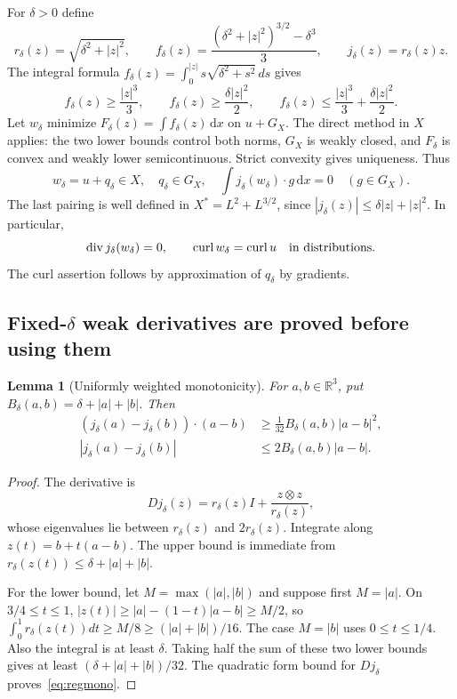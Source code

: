 \documentclass[11pt,a4paper]{article}
\newtheorem{lemma}[theorem]{Lemma}
\theoremstyle{definition}
\newcommand{\R}{\mathbb R}
\newcommand{\dd}{\,\mathrm dx}
\DeclareMathOperator{\diver}{div}
\DeclareMathOperator{\curl}{curl}
\begin{document}
For $\delta>0$ define
\begin{equation}\label{eq:regularizer}
 r_\delta(z)=\sqrt{\delta^2+|z|^2},\qquad
 f_\delta(z)=\frac{(\delta^2+|z|^2)^{3/2}-\delta^3}{3},\qquad
 j_\delta(z)=r_\delta(z)z.
\end{equation}
The integral formula $f_\delta(z)=\int_0^{|z|}s\sqrt{\delta^2+s^2}\,ds$ gives
\begin{equation}\label{eq:regularizer-growth}
 f_\delta(z)\ge\frac{|z|^3}{3},\qquad
 f_\delta(z)\ge\frac{\delta|z|^2}{2},\qquad
 f_\delta(z)\le\frac{|z|^3}{3}+\frac{\delta|z|^2}{2}.
\end{equation}
Let $w_\delta$ minimize $F_\delta(z)=\int f_\delta(z)\dd$ on $u+G_X$. The direct method in $X$ applies: the two lower bounds control both norms, $G_X$ is weakly closed, and $F_\delta$ is convex and weakly lower semicontinuous. Strict convexity gives uniqueness. Thus
\begin{equation}\label{eq:regstationary}
 w_\delta=u+q_\delta\in X,\quad q_\delta\in G_X,\quad
 \int j_\delta(w_\delta)\cdot g\dd=0\quad(g\in G_X).
\end{equation}
The last pairing is well defined in $X^*=L^2+L^{3/2}$, since $|j_\delta(z)|\le\delta|z|+|z|^2$. In particular,
\begin{equation}\label{eq:regconstraints}
 \diver j_\delta(w_\delta)=0,\qquad
 \curl w_\delta=\curl u
 \quad\hbox{in distributions}.
\end{equation}
The curl assertion follows by approximation of $q_\delta$ by gradients.

\subsection{\texorpdfstring{Fixed-$\delta$}{Fixed-delta} weak derivatives are proved before using them}

\begin{lemma}[Uniformly weighted monotonicity]\label{lem:regmono}
For $a,b\in\R^3$, put $B_\delta(a,b)=\delta+|a|+|b|$. Then
\begin{align}
 (j_\delta(a)-j_\delta(b))\cdot(a-b)
 &\ge\frac1{32}B_\delta(a,b)|a-b|^2,\label{eq:regmono}\\
 |j_\delta(a)-j_\delta(b)|&\le2B_\delta(a,b)|a-b|.\label{eq:reglip}
\end{align}
\end{lemma}
\begin{proof}
The derivative is
\[
 Dj_\delta(z)=r_\delta(z)I+\frac{z\otimes z}{r_\delta(z)},
\]
whose eigenvalues lie between $r_\delta(z)$ and $2r_\delta(z)$. Integrate along $z(t)=b+t(a-b)$. The upper bound is immediate from $r_\delta(z(t))\le\delta+|a|+|b|$.

For the lower bound, let $M=\max(|a|,|b|)$ and suppose first $M=|a|$. On $3/4\le t\le1$,
$|z(t)|\ge|a|-(1-t)|a-b|\ge M/2$, so
$\int_0^1r_\delta(z(t))dt\ge M/8\ge(|a|+|b|)/16$. The case $M=|b|$ uses $0\le t\le1/4$. Also the integral is at least $\delta$. Taking half the sum of these two lower bounds gives at least $(\delta+|a|+|b|)/32$. The quadratic form bound for $Dj_\delta$ proves~\eqref{eq:regmono}.
\end{proof}
\end{document}
